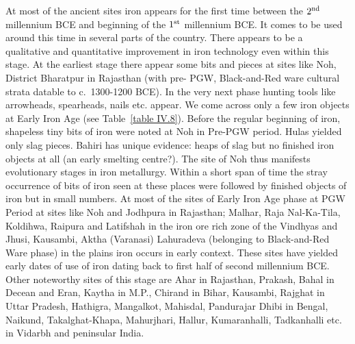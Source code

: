 At most of the ancient sites iron appears for the first time between the $2^{\rm nd}$ millennium BCE and beginning of the $1^{\rm st}$ millennium BCE. It comes to be used around this time in several parts of the country. There appears to be a qualitative and quantitative improvement in iron technology even within this stage. At the earliest stage there appear some bits and pieces at sites like Noh, District Bharatpur in Rajasthan (with pre- PGW, Black-and-Red ware cultural strata datable to c.~1300-1200 BCE). In the very next phase hunting tools like arrowheads, spearheads, nails etc. appear. We come across only a few iron objects at Early Iron Age (see Table~\ref{table IV.8}). Before the regular beginning of iron, shapeless tiny bits of iron were noted at Noh in Pre-PGW period. Hulas yielded only slag pieces. Bahiri has unique evidence: heaps of slag but no finished iron objects at all (an early smelting centre?). The site of Noh thus manifests evolutionary stages in iron metallurgy. Within a short span of time the stray occurrence of bits of iron seen at these places were followed by finished objects of iron but in small numbers. At most of the sites of Early Iron Age phase at PGW Period at sites like Noh and Jodhpura in Rajasthan; Malhar, Raja Nal-Ka-Tila, Koldihwa, Raipura and Latifshah in the iron ore rich zone of the Vindhyas and Jhusi, Kausambi, Aktha (Varanasi) Lahuradeva (belonging to Black-and-Red Ware phase) in the plains iron occurs in early context. These sites have yielded early dates of use of iron dating back to first half of second millennium BCE. Other noteworthy sites of this stage are Ahar in Rajasthan, Prakash, Bahal in Decean and Eran, Kaytha in M.P., Chirand in Bihar, Kausambi, Rajghat in Uttar Pradesh, Hathigra, Mangalkot, Mahisdal, Pandurajar Dhibi in Bengal, Naikund, Takalghat-Khapa, Mahurjhari, Hallur, Kumaranhalli, Tadkanhalli etc. in Vidarbh and peninsular India. 


